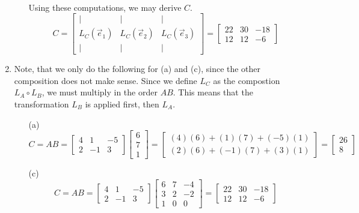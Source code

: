 \begin{SaveQuestion}
\begin{enumerate}
\begin{enumerate}
$$\begin{matrix}
\begin{array}{cl}
            \end{array}
            \end{matrix}$$
            Using these computations, we may derive $C$. 
            $$C = \begin{bmatrix} \vert & \vert & \vert \\ L_C(\vec e_1) & L_C(\vec e_2) & L_C(\vec e_3) \\ \vert & \vert & \vert \end{bmatrix} = \begin{bmatrix} 22 & 30 & -18 \\ 12 & 12 & -6 \end{bmatrix}$$
        \end{enumerate}

        \item Note, that we only do the following for (a) and (c), since the other composition does not make sense. Since we define $L_C$ as the compostion $L_A \circ L_B$, we must multiply in the order $AB$. This means that the transformation $L_B$ is applied first, then $L_A$. 
        \begin{enumerate}
            \item[(a)] $$C = AB = \begin{bmatrix} 4 & 1 & -5 \\ 2 & -1 & 3\end{bmatrix}\begin{bmatrix} 6 \\ 7\\1  \end{bmatrix} = \begin{bmatrix} (4)(6) + (1)(7) + (-5)(1) \\ (2)(6) + (-1)(7) + (3)(1) \end{bmatrix} = \begin{bmatrix} 26 \\ 8 \end{bmatrix}$$
            \item[(c)] $$C = AB = \begin{bmatrix} 4 & 1 & -5 \\ 2 & -1 & 3\end{bmatrix}\begin{bmatrix} 6 & 7 & -4 \\ 3 & 2 & -2 \\ 1 & 0 & 0 \end{bmatrix} = \begin{bmatrix} 22 & 30 & -18 \\ 12 & 12 & -6 \end{bmatrix}$$
        \end{enumerate}
    \end{enumerate}
\end{SaveQuestion}

